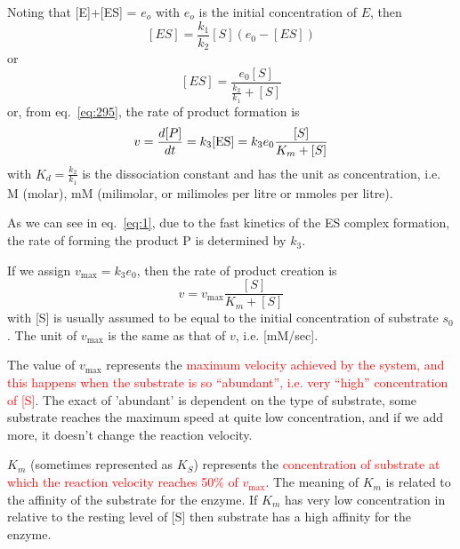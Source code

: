 Noting that [E]+[ES] = $e_o$ with $e_o$ is the initial concentration of $E$,
then
\begin{equation}
  \label{eq:295}
     [ES] = \frac{k_1}{k_{2}}[S](e_0-[ES]) 
\end{equation}
or
\begin{equation}
  \label{eq:296}
      [ES] = \frac{e_0[S]}{\frac{k_{2}}{k_{1}}+[S]} 
\end{equation}
or, from eq.~\eqref{eq:295}, the rate of product formation is
\begin{eqnarray}
  \label{eq:1}
  v = \frac{d[P]}{dt} = k_3 \ce{[ES]} =  k_3e_0\frac{[S]}{K_m+[S]} 
\end{eqnarray}
with $K_d=\frac{k_2}{k_{1}}$ is the dissociation constant and has the unit as
concentration, i.e. M (molar), mM (milimolar, or milimoles per litre or mmoles
per litre).  

As we can see in eq.~\eqref{eq:1}, due to the fast kinetics of the ES complex
formation, the rate of forming the product P is  determined by $k_3$.

If we assign $v_\max = k_3 e_0$, then
the rate of product creation is 
\begin{equation}
  \label{eq:310}
  v = v_\max \frac{[S]}{K_m+[S]}
\end{equation}
with [S] is usually assumed to be equal to the initial concentration
of substrate $s_0$. The unit of $v_\max$
is the same as that of $v$, i.e. [mM/sec].

\begin{framed}
  The value of $v_\max$ represents the \textcolor{red}{maximum velocity
  achieved by the system, and this happens when the substrate is so ``abundant'',
  i.e. very ``high'' concentration of [S]}. The exact of 'abundant' is dependent
  on the type of substrate, some substrate reaches the maximum speed at quite
  low concentration, and if we add more, it doesn't change the reaction
  velocity.

  $K_m$ (sometimes represented as $K_S$) represents the
  \textcolor{red}{concentration of substrate at which the reaction velocity
  reaches 50\%  of $v_\max$}.
  The meaning of $K_m$ is related to the affinity of the substrate for
the enzyme. If $K_m$ has very low concentration in relative to the resting
level of [S] then substrate has a high affinity for the enzyme.
   
\end{framed}

